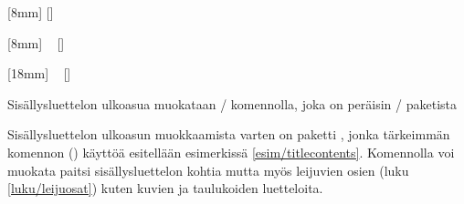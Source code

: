 \begin{esimerkki*}

\begin{koodilohko}
[8mm]                                       %
{\addvspace{1.5ex}\rmfamily\bfseries\large} %
{\contentslabel{8mm}}                       %
{\hspace{-8mm}}                             %
{\small\titlerule[0bp]\contentspage}  %
[\addvspace{.5ex}]                    %

[8mm]                                       %
{\addvspace{.5ex}\rmfamily\normalsize}      %
{\contentslabel{8mm}}                       %
{}                                          %
{~\small{}\contentspage}   %
[\addvspace{.2ex}]                          %

[18mm]                                      %
{\rmfamily\small}                           %
{\contentslabel{10mm}}                      %
{}                                          %
{~\small{}\contentspage}   %
[]                                          %
\end{koodilohko}
  \caption{Sisällysluettelon ulkoasua muokataan \-/
    komennolla, joka on peräisin \-/ paketista}
  \label{esim/titlecontents}
\end{esimerkki*}

Sisällysluettelon ulkoasun muokkaamista varten on paketti
, jonka tärkeimmän komennon
() käyttöä esitellään esimerkissä
\ref{esim/titlecontents}. Komennolla voi muokata paitsi
sisällysluettelon kohtia mutta myös leijuvien osien (luku
\ref{luku/leijuosat}) kuten kuvien ja taulukoiden luetteloita.

